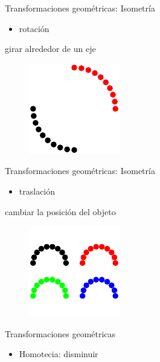 \documentclass[
  ignorenonframetext,
]{beamer}
\providecommand{\tightlist}{%
  \setlength{\itemsep}{0pt}\setlength{\parskip}{0pt}}\usepackage{longtable,booktabs,array}
\begin{document}
\begin{frame}{Transformaciones geométricas: Isometría}
\protect\hypertarget{transformaciones-geomuxe9tricas-isometruxeda}{}
\begin{itemize}
\tightlist
\item
  rotación
\end{itemize}

girar alrededor de un eje

\begin{figure}

{\centering \includegraphics{Teste_quarto_files/figure-beamer/unnamed-chunk-16-1.pdf}

}

\end{figure}
\end{frame}

\begin{frame}{Transformaciones geométricas: Isometría}
\protect\hypertarget{transformaciones-geomuxe9tricas-isometruxeda-1}{}
\begin{itemize}
\tightlist
\item
  traslación
\end{itemize}

cambiar la posición del objeto

\begin{figure}

{\centering \includegraphics{Teste_quarto_files/figure-beamer/unnamed-chunk-18-1.pdf}

}

\end{figure}
\end{frame}

\begin{frame}{Transformaciones geométricas}
\protect\hypertarget{transformaciones-geomuxe9tricas}{}
\begin{itemize}
\tightlist
\item
  Homotecia: disminuir
\end{itemize}
\end{frame}
\end{document}
